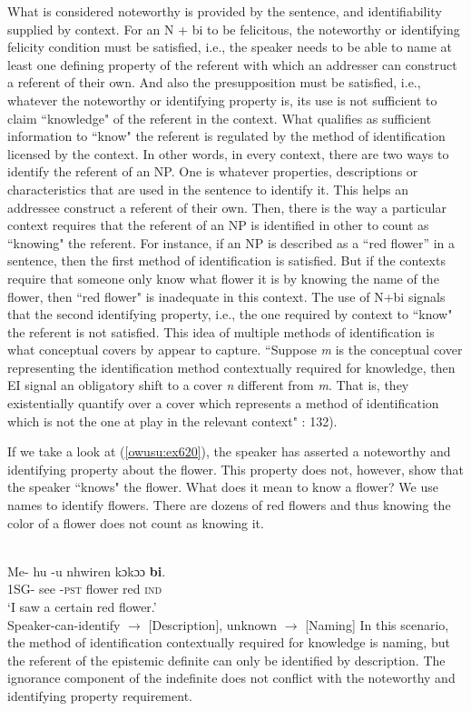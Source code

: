 \documentclass[output=paper,modfonts,nonflat,draftmode]{langsci/langscibook}
\begin{document}
 \z\z What is considered noteworthy is provided by the sentence, and identifiability supplied by context. 
For an N + bi to be felicitous, the noteworthy or identifying felicity condition must be satisfied, i.e., the speaker needs to be able to name at least one defining property of the referent with which an addresser can construct a referent of their own. And also the presupposition must be satisfied, i.e., whatever the noteworthy or identifying property is, its use is not sufficient to claim ``knowledge" of the referent in the context. What qualifies as sufficient information to ``know" the referent is regulated by the method of identification licensed by the context. In other words, in every context, there are two ways to identify the referent of an NP. One is whatever properties, descriptions or characteristics that are used in the sentence to identify it. This helps an addressee construct a referent of their own. Then, there is the way a particular context requires that the referent of an NP is identified in other to count as ``knowing" the referent. For instance, if an NP is described as a ``red flower'' in a sentence, then the first method of identification is satisfied. But if the contexts require that someone only know what flower it is by knowing the name of the flower, then ``red flower" is inadequate in this context. The use of N+bi signals that the second identifying property, i.e., the one required by context to ``know" the referent is not satisfied. This idea of multiple methods of identification is what conceptual covers by \citet{AloniPort2015} appear to capture. ``Suppose \emph{m} is the conceptual cover representing the identification method contextually required for knowledge, then EI signal an obligatory shift to a cover \emph{n} different from \emph{m}. That is, they existentially quantify over a cover which represents a method of identification which is not the one at play in the relevant context" \citep{AloniPort2015}: 132). 

If we take a look at (\ref{owusu:ex620}), the speaker has asserted a noteworthy and identifying property about the flower.  This property does not, however, show that the speaker ``knows" the flower. What does it mean to know a flower? We use names to identify flowers. There are dozens of red flowers and thus knowing the color of a flower does not count as knowing it. 


\ea\label{owusu:ex620}\\
\gll Me- hu -u nhwiren kɔkɔɔ \textbf{bi}.\\
 1SG- see -\textsc{pst}  flower red \textsc{ind} \\
\glt `I saw a certain red flower.'\\
Speaker-can-identify $\rightarrow$ [Description], unknown $\rightarrow$  [Naming]
 \z  
In this scenario, the method of identification contextually required for knowledge is naming, but the referent of the epistemic definite can only be identified by description. The ignorance component of the indefinite does not conflict with the noteworthy and identifying property requirement.
\end{document}
